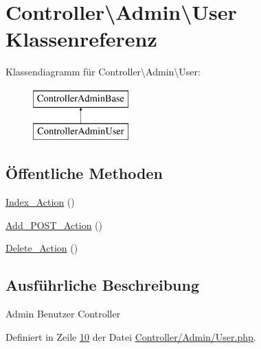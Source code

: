 \hypertarget{class_controller_1_1_admin_1_1_user}{\section{Controller\textbackslash{}Admin\textbackslash{}User Klassenreferenz}
\label{class_controller_1_1_admin_1_1_user}
}
Klassendiagramm für Controller\textbackslash{}Admin\textbackslash{}User\-:\begin{figure}[H]
\begin{center}
\leavevmode
\includegraphics[height=2.000000cm]{class_controller_1_1_admin_1_1_user}
\end{center}
\end{figure}
\subsection*{Öffentliche Methoden}
\begin{DoxyCompactItemize}
\item 
\hyperlink{class_controller_1_1_admin_1_1_user_a006c1efe9d23f5307039c1beb0ce18a5}{Index\-\_\-\-Action} ()
\item 
\hyperlink{class_controller_1_1_admin_1_1_user_a381c8672d1cec6440138d0bf939fb5ec}{Add\-\_\-\-P\-O\-S\-T\-\_\-\-Action} ()
\item 
\hyperlink{class_controller_1_1_admin_1_1_user_a96952a534cf944ff774fdab36d8efaaa}{Delete\-\_\-\-Action} ()
\end{DoxyCompactItemize}


\subsection{Ausführliche Beschreibung}
Admin Benutzer Controller 

Definiert in Zeile \hyperlink{_controller_2_admin_2_user_8php_source_l00010}{10} der Datei \hyperlink{_controller_2_admin_2_user_8php_source}{Controller/\-Admin/\-User.\-php}.



